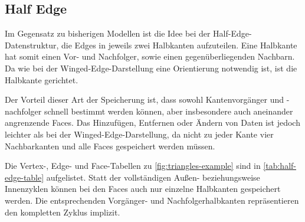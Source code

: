 \subsection{Half Edge}
\label{subsec:half-edge}

Im Gegensatz zu bisherigen Modellen ist die Idee bei der Half-Edge-Datenstruktur, die Edges in jeweils zwei Halbkanten aufzuteilen.
Eine Halbkante hat somit einen Vor- und Nachfolger, sowie einen gegenüberliegenden Nachbarn.
Da wie bei der Winged-Edge-Darstellung eine Orientierung notwendig ist, ist die Halbkante gerichtet.

Der Vorteil dieser Art der Speicherung ist, dass sowohl Kantenvorgänger und -nachfolger schnell bestimmt werden können, aber insbesondere auch aneinander angrenzende Faces. Das Hinzufügen, Entfernen oder Ändern von Daten ist jedoch leichter als bei der Winged-Edge-Darstellung, da nicht zu jeder Kante vier Nachbarkanten und alle Faces gespeichert werden müssen.

Die Vertex-, Edge- und Face-Tabellen zu \autoref{fig:triangles-example} sind in \autoref{tab:half-edge-table} aufgelistet. Statt der vollständigen Außen- beziehungsweise Innenzyklen können bei den Faces auch nur einzelne Halbkanten gespeichert werden. Die entsprechenden Vorgänger- und Nachfolgerhalbkanten repräsentieren den kompletten Zyklus implizit.

